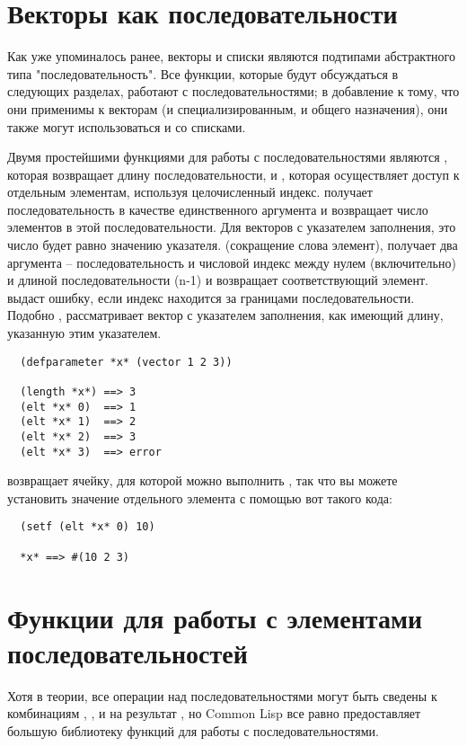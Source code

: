 \section{Векторы как последовательности}

Как уже упоминалось ранее, векторы и списки являются подтипами абстрактного типа
"последовательность".  Все функции, которые будут обсуждаться в следующих разделах,
работают с последовательностями; в добавление к тому, что они применимы к векторам (и
специализированным, и общего назначения), они также могут использоваться и со списками.

Двумя простейшими функциями для работы с последовательностями являются ,
которая возвращает длину последовательности, и , которая осуществляет доступ к
отдельным элементам, используя целочисленный индекс.   получает
последовательность в качестве единственного аргумента и возвращает число элементов в этой
последовательности.  Для векторов с указателем заполнения, это число будет равно значению
указателя.  (сокращение слова элемент), получает два аргумента --
последовательность и числовой индекс между нулем (включительно) и длиной
последовательности (n-1) и возвращает соответствующий элемент.   выдаст ошибку,
если индекс находится за границами последовательности.  Подобно , 
рассматривает вектор с указателем заполнения, как имеющий длину, указанную этим
указателем.

\begin{verbatim}
  (defparameter *x* (vector 1 2 3))
  
  (length *x*) ==> 3
  (elt *x* 0)  ==> 1
  (elt *x* 1)  ==> 2
  (elt *x* 2)  ==> 3
  (elt *x* 3)  ==> error
\end{verbatim}

 возвращает ячейку, для которой можно выполнить , так что вы можете
установить значение отдельного элемента с помощью вот такого кода:

\begin{verbatim}
  (setf (elt *x* 0) 10)
  
  *x* ==> #(10 2 3)
\end{verbatim}

\section{Функции для работы с элементами последовательностей}

Хотя в теории, все операции над последовательностями могут быть сведены к комбинациям
, , и  на результат , но Common Lisp все равно
предоставляет большую библиотеку функций для работы с последовательностями.

